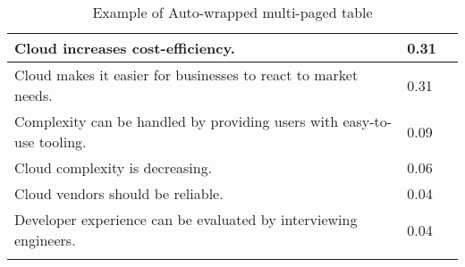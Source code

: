 \begin{longtable}{|p{10cm}|p{2cm}|p{2cm}|}
Cloud increases cost-efficiency. & 0.31 \\ \hline
Cloud makes it easier for businesses to react to market needs. & 0.31 \\ \hline
Complexity can be handled by providing users with easy-to-use tooling. & 0.09 \\ \hline
Cloud complexity is decreasing. & 0.06 \\ \hline
Cloud vendors should be reliable. & 0.04 \\ \hline
Developer experience can be evaluated by interviewing engineers. & 0.04 \\ \hline
\caption{Example of Auto-wrapped multi-paged table}
\label{tab:table1}
\end{longtable}
